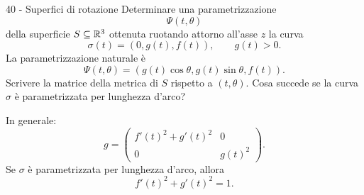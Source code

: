 \documentclass[a4paper]{article}
\begin{document}
\begin{snippetexercise}{40 - Superfici di rotazione}
    Determinare una parametrizzazione
    \[
        \Psi(t,\theta)
    \]
    della superficie \(S\subseteq\mathbb{R}^3\) ottenuta ruotando
    attorno all'asse \(z\) la curva
    \[
        \sigma(t)=\left(0,g(t),f(t)\right),
        \qquad
        g(t)>0.
    \]
    La parametrizzazione naturale è
    \[
        \Psi(t,\theta)
        =
        \left(
            g(t)\cos\theta,
            g(t)\sin\theta,
            f(t)
        \right).
    \]
    Scrivere la matrice della metrica di \(S\) rispetto a
    \((t,\theta)\). Cosa succede se la curva \(\sigma\) è
    parametrizzata per lunghezza d'arco?

    In generale:
    \[
        g
        =
        \begin{pmatrix}
            f'(t)^2+g'(t)^2 & 0\\
            0 & g(t)^2
        \end{pmatrix}.
    \]
    Se \(\sigma\) è parametrizzata per lunghezza d'arco, allora
    \[
        f'(t)^2+g'(t)^2=1.
    \]
\end{snippetexercise}
\end{document}
